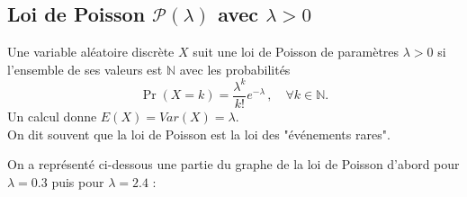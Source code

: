 \documentclass[12pt, a4paper]{book}
\numberwithin{equation}{section}
\begin{document}
\subsection[Loi de Poisson]{Loi de Poisson $\mathcal{P}(\lambda)$ avec $\lambda>0$}

Une variable aléatoire discrète $X$ suit une loi de Poisson de paramètres $\lambda>0$ si l'ensemble de ses valeurs est
$\mathbb{N}$ avec les probabilités 
$$
\Pr(X=k)=\frac{\lambda^k}{k !} e^{-\lambda} \,, \quad \forall k\in\mathbb{N}.
$$
Un calcul donne $E(X)=Var(X)=\lambda$.\\

On dit souvent que la loi de Poisson est la loi des "événements rares".

On a représenté ci-dessous une partie du graphe de la loi de Poisson d'abord pour $\lambda=0.3$ puis pour $\lambda=2.4$ :

\begin{center}
\end{center}
\end{document}
